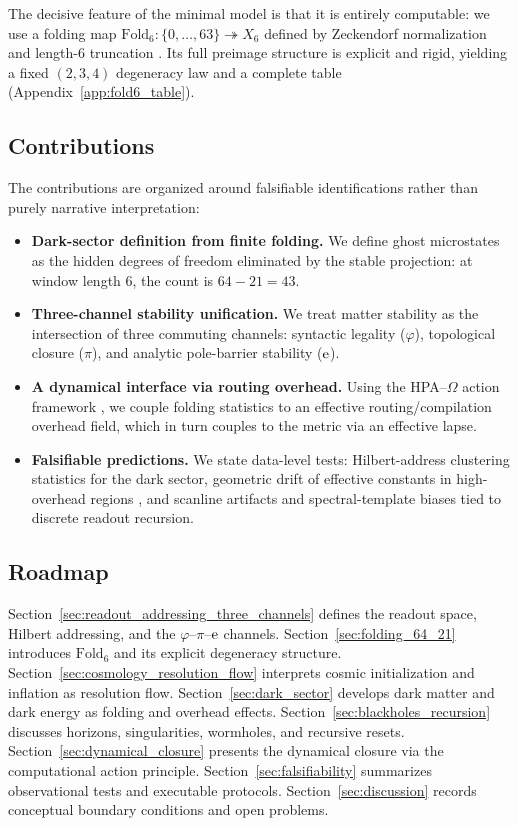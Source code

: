 The decisive feature of the minimal model is that it is entirely computable:
we use a folding map $\mathrm{Fold}_6:\{0,\dots,63\}\twoheadrightarrow X_6$ defined by Zeckendorf normalization and length-$6$ truncation \cite{Ma2025RF}.
Its full preimage structure is explicit and rigid, yielding a fixed $(2,3,4)$ degeneracy law and a complete table (Appendix~\ref{app:fold6_table}).

\subsection{Contributions}
\label{subsec:intro_contributions}

The contributions are organized around falsifiable identifications rather than purely narrative interpretation:
\begin{itemize}
\item \textbf{Dark-sector definition from finite folding.}
We define ghost microstates as the hidden degrees of freedom eliminated by the stable projection: at window length $6$, the count is $64-21=43$.
\item \textbf{Three-channel stability unification.}
We treat matter stability as the intersection of three commuting channels: syntactic legality ($\varphi$), topological closure ($\pi$), and analytic pole-barrier stability ($\mathrm{e}$).
\item \textbf{A dynamical interface via routing overhead.}
Using the HPA--$\Omega$ action framework \cite{Ma2025CAP,Ma2025FoP}, we couple folding statistics to an effective routing/compilation overhead field, which in turn couples to the metric via an effective lapse.
\item \textbf{Falsifiable predictions.}
We state data-level tests: Hilbert-address clustering statistics for the dark sector, geometric drift of effective constants in high-overhead regions \cite{Ma2025PCG}, and scanline artifacts and spectral-template biases tied to discrete readout recursion.
\end{itemize}

\subsection{Roadmap}
\label{subsec:intro_roadmap}

Section~\ref{sec:readout_addressing_three_channels} defines the readout space, Hilbert addressing, and the $\varphi$--$\pi$--$\mathrm{e}$ channels.
Section~\ref{sec:folding_64_21} introduces $\mathrm{Fold}_6$ and its explicit degeneracy structure.
Section~\ref{sec:cosmology_resolution_flow} interprets cosmic initialization and inflation as resolution flow.
Section~\ref{sec:dark_sector} develops dark matter and dark energy as folding and overhead effects.
Section~\ref{sec:blackholes_recursion} discusses horizons, singularities, wormholes, and recursive resets.
Section~\ref{sec:dynamical_closure} presents the dynamical closure via the computational action principle.
Section~\ref{sec:falsifiability} summarizes observational tests and executable protocols.
Section~\ref{sec:discussion} records conceptual boundary conditions and open problems.




